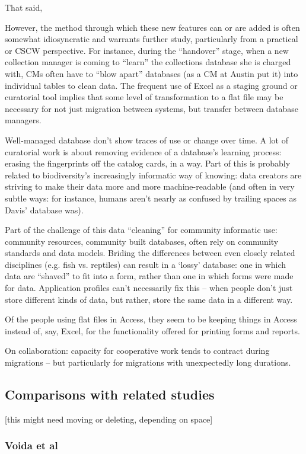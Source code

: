 That said, 

However, the method through which these new features can or are added is often somewhat idiosyncratic and warrants further study, particularly from a practical or CSCW perspective. For instance, during the “handover” stage, when a new collection manager is coming to “learn” the collections database she is charged with, CMs often have to “blow apart” databases (as a CM at Austin put it) into individual tables to clean data. The frequent use of Excel as a staging ground or curatorial tool implies that some level of transformation to a flat file may be necessary for not just migration between systems, but transfer between database managers. 


Well-managed database don’t show traces of use or change over time.  A lot of curatorial work is about removing evidence of a database’s learning process: erasing the fingerprints off the catalog cards, in a way.  Part of this is probably related to biodiversity’s increasingly informatic way of knowing: data creators are striving to make their data more and more machine-readable (and often in very subtle ways: for instance, humans aren’t nearly as confused by trailing spaces as Davis’ database was). 

Part of the challenge of this data “cleaning” for community informatic use: community resources, community built databases, often rely on community standards and data models.  Briding the differences between even closely related disciplines (e.g. fish vs. reptiles) can result in a ‘lossy’ database: one in which data are “shaved” to fit into a form, rather than one in which forms were made for data.  
Application profiles can’t necessarily fix this – when people don’t just store different kinds of data, but rather, store the same data in a different way.

Of the people using flat files in Access, they seem to be keeping things in Access instead of, say, Excel, for the functionality offered for printing forms and reports. 


On collaboration: capacity for cooperative work tends to contract during migrations – but particularly for migrations with unexpectedly long durations.


\subsection{Comparisons with related studies}
[this might need moving or deleting, depending on space]
\subsubsection{Voida et al}

